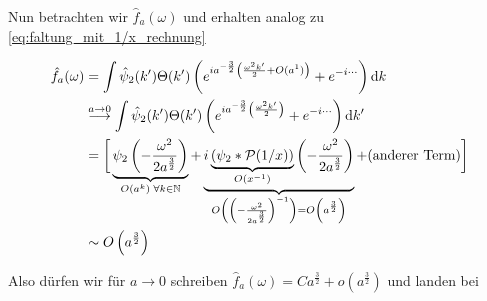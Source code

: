 Nun betrachten wir $\hat f_a(\omega)$ und erhalten analog zu
\cref{eq:faltung_mit_1/x_rechnung}

\begin{align*}
    \hat f_a(\omega)
    &=
    \int \hat\psi_2(k')\Theta(k')
    \left(
        e^{i a^{-\frac{3}{2}}\left(\frac{\omega^2 k'}{2} + O(a^1)\right)}
        + e^{-i \cdots}
    \right) \mathop{}\!\mathrm{d} k
    \\ &\stackrel{a \to 0}{\longrightarrow}
    \int \hat\psi_2(k')\Theta(k')
    \left(
        e^{i a^{-\frac{3}{2}}\left(\frac{\omega^2 k'}{2}\right)}
        + e^{-i \cdots}
    \right) \mathop{}\!\mathrm{d} k'
    \\ &=
    \bigg[
        \underbrace{
            \psi_2\left(-\frac{\omega^2}{2 a^{\frac{3}{2}}}\right)
        }_{O(a^k) \; \forall k \in \mathbb{N}}
        + \underbrace{i
            \underbrace{\left(\psi_2 * \mathcal{P}(1/x)\right)}_{O(x^{-1})}
            \left(-\frac{\omega^2}{2 a^{\frac{3}{2}}}\right)
        }_{
            O\left(\left(-\frac{\omega^2}{2 a^{\frac{3}{2}}}\right)^{-1}\right)
            = O\left(a^{\frac{3}{2}}\right)
           }
     + (\textrm{anderer Term})
     \bigg]
     \\ &\sim
    O\left(a^{\frac{3}{2}}\right)
\end{align*}

Also dürfen wir für $a \to 0$ schreiben $\hat f_a(\omega) = C a^{\frac{3}{2}} + o\left(a^{\frac{3}{2}}\right)$ und landen bei


